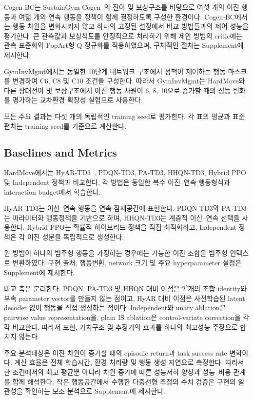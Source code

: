 \documentclass[10pt,journal]{IEEEtran}
\begin{document}
Cogen-BC는 SustainGym Cogen~\cite{yeh2023}의 전이 및 보상구조를 바탕으로 여섯 개의 이진 행동과 여덟 개의 연속 행동을 정책이 함께 결정하도록 구성한 환경이다. Cogen-BC에서는 행동 차원을 변화시키지 않고 하나의 고정된 설정에서 비교 방법들과의 제어 성능을 평가한다. 큰 관측값과 보상척도를 안정적으로 처리하기 위해 제안 방법의 critic에는 관측 표준화와 PopArt형 Q 정규화를 적용하였으며, 구체적인 절차는 Supplement에 제시한다.

GymInvMgmt에서는 동일한 10단계 네트워크 구조에서 정책이 제어하는 행동 마스크를 변경하여 C6, C8 및 C10 조건을 구성한다. 따라서 GymInvMgmt는 HardMove와 다른 상태전이 및 보상구조에서 이진 행동 차원이 6, 8, 10으로 증가할 때의 성능 변화를 평가하는 교차환경 확장성 실험으로 사용한다.

모든 주요 결과는 다섯 개의 독립적인 training seed로 평가한다. 각 표의 평균과 표준편차는 training seed를 기준으로 계산한다.


\subsection{Baselines and Metrics}

HardMove에서는 HyAR-TD3~\cite{li2022hyar}, PDQN-TD3, PA-TD3, HHQN-TD3, Hybrid PPO 및 Independent 정책과 비교한다. 각 방법은 동일한 복수 이진--연속 행동형식과 interaction budget에서 학습한다.

HyAR-TD3는 이산--연속 행동을 연속 잠재공간에 표현한다. PDQN-TD3와 PA-TD3는 파라미터화 행동정책을 기반으로 하며, HHQN-TD3는 계층적 이산--연속 선택을 사용한다. Hybrid PPO는 확률적 하이브리드 정책을 직접 최적화하고, Independent 정책은 각 이진 성분을 독립적으로 생성한다.

원 방법이 하나의 범주형 행동을 가정하는 경우에는 가능한 이진 조합을 범주형 인덱스로 변환하였다. 구현 출처, 행동변환, network 크기 및 주요 hyperparameter 설정은 Supplement에 제시한다.

비교 축은 분리한다. PDQN, PA-TD3 및 HHQN 대비 이점은 $2^b$개의 조합 identity와 부속 parameter vector를 만들지 않는 점이고, HyAR 대비 이점은 사전학습된 latent decoder 없이 행동을 직접 생성하는 점이다. Independent와 unary ablation은 pairwise value representation을, plain IS ablation은 control-variate correction을 각각 비교한다. 따라서 표현, 가치구조 및 추정기의 효과를 하나의 최고성능 주장으로 합치지 않는다.

주요 분석대상은 이진 차원이 증가할 때의 episodic return과 task success rate 변화이다. 계산 효율은 전체 학습시간, 환경 처리량 및 행동 생성 지연으로 측정한다. 따라서 한 조건에서의 최고 평균뿐 아니라 차원 증가에 따른 성능저하 양상과 성능--비용 관계를 함께 해석한다. 작은 행동공간에서 수행한 다중선형 추정의 수치 검증은 구현의 일관성을 확인하는 보조 분석으로 Supplement에 제시한다.
\end{document}
